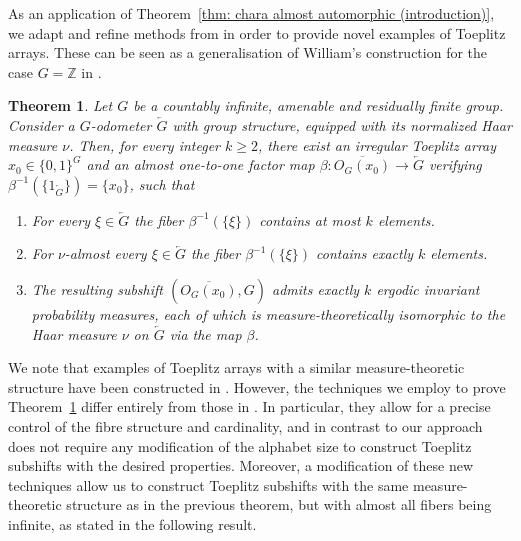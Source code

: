 \documentclass[titlepage,reqno,10pt]{amsart}
\newtheorem{theorem}{Theorem}[section]
\theoremstyle{definition}
\def\Z{{\mathbb Z}}
\begin{document}
As an application of Theorem~\ref{thm: chara almost automorphic (introduction)}, we adapt and refine methods from \cite{FuGlJäOe21, JLO19} in order to provide novel examples of Toeplitz arrays. These can be seen as a generalisation of William's construction for the case $G=\Z$ in \cite{Wi84}.  

\begin{theorem} \label{thm: existence of k-1 Toeplitz arrays}
Let \( G \) be a countably infinite, amenable and residually finite group. Consider a  $G$-odometer \( \overleftarrow{G} \) with group structure, equipped with its normalized Haar measure $\nu$. Then, for every integer \( k \geq 2 \), there exist an irregular Toeplitz array \( x_0 \in \{0,1\}^G \)  and an almost one-to-one  factor map $\beta: \overline{O_G(x_0)} \to \overleftarrow{G}$ verifying $\beta^{-1}(\{1_{\overleftarrow{G}}\})=\{x_0\}$, such that
\begin{enumerate}
\item For every $\xi\in \overleftarrow{G}$ the fiber $\beta^{-1}(\{\xi\})$ contains at most $k$ elements.
\item For $\nu$-almost every $\xi\in \overleftarrow{G}$ the fiber $\beta^{-1}(\{\xi\})$ contains exactly $k$
elements.
\item The resulting subshift \( (\overline{O_G(x_0)}, G) \) admits exactly \( k \) ergodic invariant probability measures, each of which is measure-theoretically isomorphic to the Haar measure \( \nu \) on \( \overleftarrow{G} \) via the map $\beta$.
\end{enumerate}
\end{theorem}
We note that examples of Toeplitz arrays with a similar measure-theoretic structure have been constructed in \cite{CeCoGo23}. However, the techniques we employ to prove Theorem~\ref{thm: existence of k-1 Toeplitz arrays} differ entirely from those in \cite{CeCoGo23}. In particular, they allow for a precise control of the fibre structure and cardinality, and in contrast to \cite{CeCoGo23} our approach does not require any modification of the alphabet size to construct Toeplitz subshifts with the desired properties. Moreover, a modification of these new techniques allow us to construct Toeplitz subshifts with the same measure-theoretic structure as in the previous theorem, but with almost all fibers being infinite, as stated in the following result. 
\end{document}

